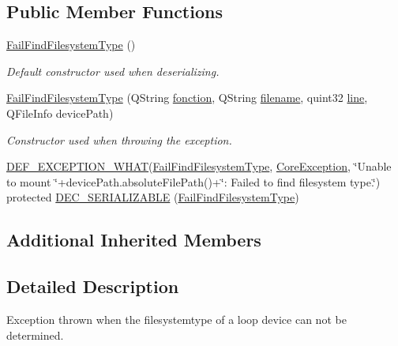 \subsection*{Public Member Functions}
\begin{DoxyCompactItemize}
\item 
\hyperlink{class_gost_crypt_1_1_core_1_1_fail_find_filesystem_type_ae6056d540808b119c49ee8e0d5ca9ac7}{Fail\+Find\+Filesystem\+Type} ()
\begin{DoxyCompactList}\small\item\em Default constructor used when deserializing. \end{DoxyCompactList}\item 
\hyperlink{class_gost_crypt_1_1_core_1_1_fail_find_filesystem_type_ab96f80a9f439fbef87c6eac5ea0f59b0}{Fail\+Find\+Filesystem\+Type} (Q\+String \hyperlink{class_gost_crypt_1_1_gost_crypt_exception_a29b8c93d5efbb1ff369107385725a939}{fonction}, Q\+String \hyperlink{class_gost_crypt_1_1_gost_crypt_exception_a749a12375f4ba9d502623b99d8252f38}{filename}, quint32 \hyperlink{class_gost_crypt_1_1_gost_crypt_exception_abf506d911f12a4e969eea500f90bd32c}{line}, Q\+File\+Info device\+Path)
\begin{DoxyCompactList}\small\item\em Constructor used when throwing the exception. \end{DoxyCompactList}\item 
\hyperlink{_gost_crypt_exception_8h_a5bc1e1c6c9d6f46c84eeba49e33355f9}{D\+E\+F\+\_\+\+E\+X\+C\+E\+P\+T\+I\+O\+N\+\_\+\+W\+H\+AT}(\hyperlink{class_gost_crypt_1_1_core_1_1_fail_find_filesystem_type}{Fail\+Find\+Filesystem\+Type}, \hyperlink{class_gost_crypt_1_1_core_1_1_core_exception}{Core\+Exception}, \char`\"{}Unable to mount \char`\"{}+device\+Path.\+absolute\+File\+Path()+\char`\"{}\+: Failed to find filesystem type.\char`\"{}) protected \hyperlink{class_gost_crypt_1_1_core_1_1_fail_find_filesystem_type_a51552d5de10fea5309226c4eac048f2b}{D\+E\+C\+\_\+\+S\+E\+R\+I\+A\+L\+I\+Z\+A\+B\+LE} (\hyperlink{class_gost_crypt_1_1_core_1_1_fail_find_filesystem_type}{Fail\+Find\+Filesystem\+Type})
\end{DoxyCompactItemize}
\subsection*{Additional Inherited Members}


\subsection{Detailed Description}
Exception thrown when the filesystemtype of a loop device can not be determined. 

